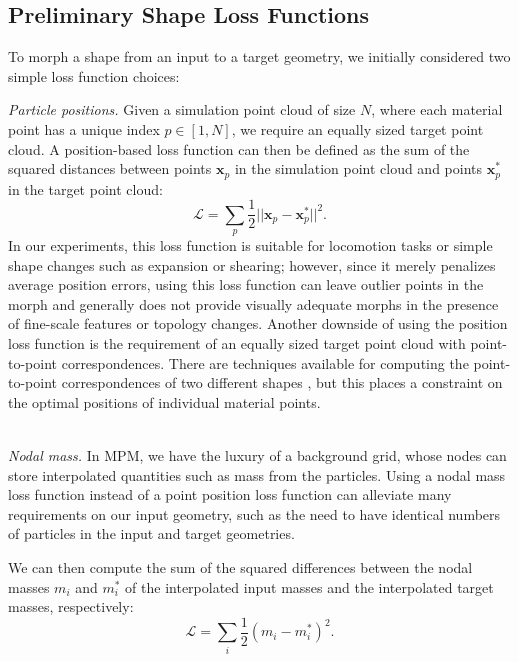 \subsection{Preliminary Shape Loss Functions}
    To morph a shape from an input to a target geometry, we initially considered two simple loss function choices:

    \textit{Particle positions.} Given a simulation point cloud of size $N$, where
    each material point has a unique index $p \in [1, N]$, we require an
    equally sized target point cloud. A position-based loss function can then be defined as
    the sum of the squared distances between points $\mathbf{x}_p$ in the simulation
    point cloud and points $\mathbf{x}^*_p$ in the target point cloud:
    \begin{equation}
        \mathcal{L} = \sum_p \frac{1}{2}||\mathbf{x}_p - \mathbf{x}_p^*||^2 .
    \end{equation}
    In our experiments, this loss function is suitable for locomotion tasks or simple shape changes such as expansion or shearing;
    however, since it merely penalizes average position errors, using this loss function can leave outlier points in the morph and generally does not provide visually adequate morphs in the presence of fine-scale features or topology changes. 
    Another downside of using the position loss function is the requirement of an equally sized target point cloud with point-to-point correspondences.
    There are techniques available for computing the point-to-point correspondences of two different shapes \citep{2011-ShapeCorrespondenceSurvey}, but this places a constraint on the optimal positions of individual material points.

    \noindent \\ \textit{Nodal mass.}
    In {MPM}, we have the luxury of a background grid, whose nodes can store interpolated quantities such as mass from the particles.
    Using a nodal mass loss function instead of a point position loss function can alleviate many requirements on our input geometry, such as the need to have identical numbers of particles in the input and target geometries.
    
    We can then compute the sum of the squared differences between the nodal masses $m_i$ and $m_i^*$ of the interpolated input masses and the interpolated target masses, respectively:
    \begin{equation}
        \mathcal{L} = \sum_{i} \frac{1}{2} (m_i - m^*_i)^2 .
    \end{equation}
    
